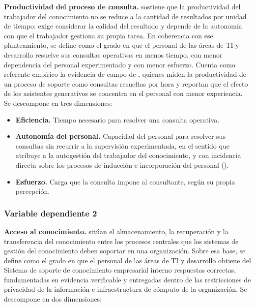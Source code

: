 \textbf{Productividad del proceso de consulta.} \textcite{Drucker1999_KWProductivity} sostiene que la productividad del trabajador del conocimiento no se reduce a la cantidad de resultados por unidad de tiempo: exige considerar la calidad del resultado y depende de la autonomía con que el trabajador gestiona su propia tarea. En coherencia con ese planteamiento, se define como el grado en que el personal de las áreas de TI y desarrollo resuelve sus consultas operativas en menos tiempo, con menor dependencia del personal experimentado y con menor esfuerzo. Cuenta como referente empírico la evidencia de campo de \textcite{Brynjolfsson2025_GenAIWork}, quienes miden la productividad de un proceso de soporte como consultas resueltas por hora y reportan que el efecto de los asistentes generativos se concentra en el personal con menor experiencia. Se descompone en tres dimensiones:

\begin{itemize}
	\item \textbf{Eficiencia.} Tiempo necesario para resolver una consulta operativa.
	\item \textbf{Autonomía del personal.} Capacidad del personal para resolver sus consultas sin recurrir a la supervisión experimentada, en el sentido que \textcite{Drucker1999_KWProductivity} atribuye a la autogestión del trabajador del conocimiento, y con incidencia directa sobre los procesos de inducción e incorporación del personal (\cite{Achury2016induccion}).
	\item \textbf{Esfuerzo.} Carga que la consulta impone al consultante, según su propia percepción.
\end{itemize}

\subsubsection*{Variable dependiente 2}

\textbf{Acceso al conocimiento.} \textcite{Alavi2001_KMS} sitúan el almacenamiento, la recuperación y la transferencia del conocimiento entre los procesos centrales que los sistemas de gestión del conocimiento deben soportar en una organización. Sobre esa base, se define como el grado en que el personal de las áreas de TI y desarrollo obtiene del Sistema de soporte de conocimiento empresarial interno respuestas correctas, fundamentadas en evidencia verificable y entregadas dentro de las restricciones de privacidad de la información e infraestructura de cómputo de la organización. Se descompone en dos dimensiones:


